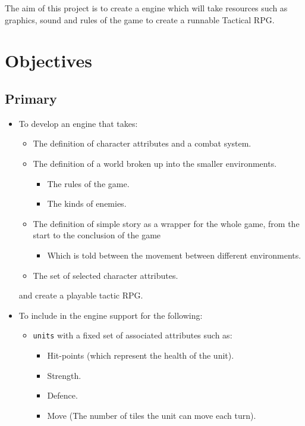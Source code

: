 The aim of this project is to create a engine which will take resources such as graphics, sound and rules of the game to create a runnable Tactical RPG.

\section{Objectives}

\subsection{Primary}
 \label{primary}
\begin{itemize}
\item To develop an engine that takes:
\begin{itemize}

 \item The definition of character attributes and a combat system.
	\item The definition of a world broken up into the smaller environments.
	\begin{itemize}
		\item The rules of the game.
		\item The kinds of enemies.
	\end{itemize}
	
	\item The definition of simple story as a wrapper for the whole game, from the start to the conclusion of the game
	\begin{itemize}
		\item Which is told between the movement between different environments.
	\end{itemize}
	                        
	\item The set of selected character attributes.
	
\end{itemize}
and create a playable tactic RPG.

\item To include in the engine support for the following:
\begin{itemize}
	\item \texttt{units} with a fixed set of associated attributes such as:
	\begin{itemize}
		\item Hit-points (which represent the health of the unit).
		\item Strength.
		\item Defence.
		\item Move (The number of tiles the unit can move each turn).
	\end{itemize}
	

\end{itemize}
\end{itemize}
